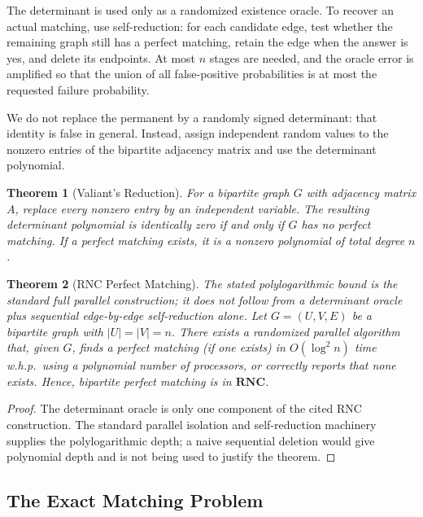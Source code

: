 \documentclass[twoside,12pt]{book}
\theoremstyle{plain}
\newtheorem{theorem}{Theorem}[chapter]
\theoremstyle{definition}
\theoremstyle{remark}
\begin{document}
The determinant is used only as a randomized existence oracle. To recover an
actual matching, use self-reduction: for each candidate edge, test whether the
remaining graph still has a perfect matching, retain the edge when the answer
is yes, and delete its endpoints. At most $n$ stages are needed, and the
oracle error is amplified so that the union of all false-positive probabilities
is at most the requested failure probability.

We do not replace the permanent by a randomly signed determinant: that
identity is false in general. Instead, assign independent random values to
the nonzero entries of the bipartite adjacency matrix and use the determinant
polynomial.

\begin{theorem}[Valiant's Reduction]
\label{thm:valiant-bis}
For a bipartite graph $G$ with adjacency matrix $A$, replace every nonzero
entry by an independent variable. The resulting determinant polynomial is
identically zero if and only if $G$ has no perfect matching. If a perfect
matching exists, it is a nonzero polynomial of total degree $n$.
\end{theorem}

\begin{theorem}[RNC Perfect Matching]
The stated polylogarithmic bound is the standard full parallel construction;
it does not follow from a determinant oracle plus sequential edge-by-edge
self-reduction alone.
\label{thm:rnc-pm}
Let $G = (U, V, E)$ be a bipartite graph with $|U| = |V| = n$. There exists a randomized parallel algorithm that, given $G$, finds a perfect matching (if one exists) in $O(\log^2 n)$ time w.h.p.\ using a polynomial number of processors, or correctly reports that none exists. Hence, bipartite perfect matching is in $\mathbf{RNC}$.
\end{theorem}

\begin{proof}
The determinant oracle is only one component of the cited RNC construction.
The standard parallel isolation and self-reduction machinery supplies the
polylogarithmic depth; a naive sequential deletion would give polynomial
depth and is not being used to justify the theorem.
\end{proof}

\subsection{The Exact Matching Problem}
\label{subsec:exact-matching}
\end{document}
